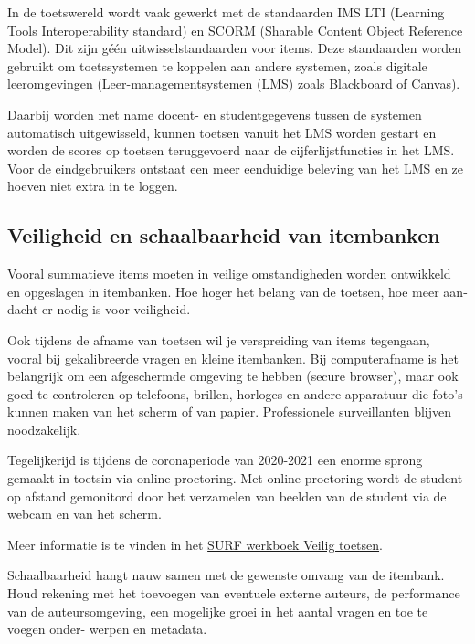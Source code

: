 \documentclass[
]{book}
\begin{document}
In de toetswereld wordt vaak gewerkt met de standaarden IMS LTI (Learning Tools Interoperability standard) en SCORM (Sharable Content Object Reference Model). Dit zijn géén uitwisselstandaarden voor items. Deze standaarden worden gebruikt om toetssystemen te koppelen aan andere systemen, zoals digitale leeromgevingen (Leer-managementsystemen (LMS) zoals Blackboard of Canvas).

Daarbij worden met name docent- en studentgegevens tussen de systemen automatisch uitgewisseld, kunnen toetsen vanuit het LMS worden gestart en worden de scores op toetsen teruggevoerd naar de cijferlijstfuncties in het LMS. Voor de eindgebruikers ontstaat een meer eenduidige beleving van het LMS en ze hoeven niet extra in te loggen.

\hypertarget{veiligheid-en-schaalbaarheid-van-itembanken}{%
\subsection{Veiligheid en schaalbaarheid van itembanken}\label{veiligheid-en-schaalbaarheid-van-itembanken}}

Vooral summatieve items moeten in veilige omstandigheden worden ontwikkeld en opgeslagen in itembanken. Hoe hoger het belang van de toetsen, hoe meer aan- dacht er nodig is voor veiligheid.

Ook tijdens de afname van toetsen wil je verspreiding van items tegengaan, vooral bij gekalibreerde vragen en kleine itembanken. Bij computerafname is het belangrijk om een afgeschermde omgeving te hebben (secure browser), maar ook goed te controleren op telefoons, brillen, horloges en andere apparatuur die foto's kunnen maken van het scherm of van papier. Professionele surveillanten blijven noodzakelijk.

Tegelijkerijd is tijdens de coronaperiode van 2020-2021 een enorme sprong gemaakt in toetsin via online proctoring. Met online proctoring wordt de student op afstand gemonitord door het verzamelen van beelden van de student via de webcam en van het scherm.

Meer informatie is te vinden in het \href{https://www.surf.nl/kennisbank/2016/werkboek-veilig-toetsen.html}{SURF werkboek Veilig toetsen}.

Schaalbaarheid hangt nauw samen met de gewenste omvang van de itembank. Houd rekening met het toevoegen van eventuele externe auteurs, de performance van de auteursomgeving, een mogelijke groei in het aantal vragen en toe te voegen onder- werpen en metadata.
\end{document}
